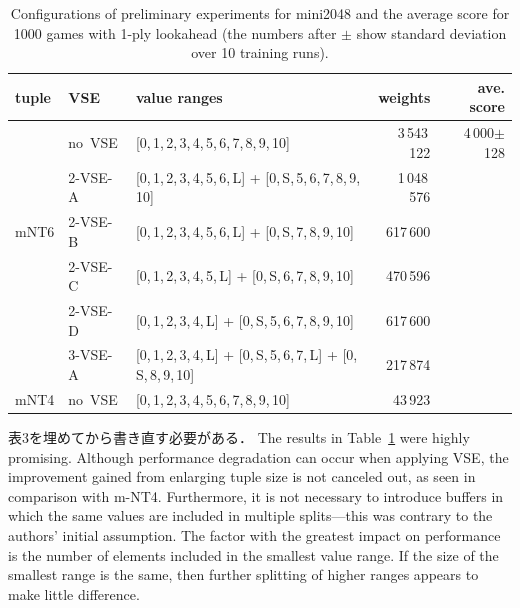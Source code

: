 \begin{table}
\caption{Configurations of preliminary experiments for mini2048 and the average score for 1000 games with 1-ply lookahead (the numbers after $\pm$ show standard deviation over 10 training runs).}
\label{table:pre-results}
 \small\begin{tabular}{l|l|l|r|r}
  \hline\hline
   tuple & VSE & value ranges & weights & ave. score \\
  \hline
   \multirow{5}{*}{mNT6}	& \mbox{no VSE}		& [0,\,1,\,2,\,3,\,4,\,5,\,6,\,7,\,8,\,9,\,10]				& 3\,543\,122	& 4\,000$\pm$128 \\ \cline{2-5}
				& \mbox{2-VSE-A}	& [0,\,1,\,2,\,3,\,4,\,5,\,6,\,L] + [0,\,S,\,5,\,6,\,7,\,8,\,9,\,10]		& 1\,048\,576	& \\ \cline{2-5}
				& \mbox{2-VSE-B}	& [0,\,1,\,2,\,3,\,4,\,5,\,6,\,L] + [0,\,S,\,7,\,8,\,9,\,10]		& 617\,600	& \\ \cline{2-5}
				& \mbox{2-VSE-C}	& [0,\,1,\,2,\,3,\,4,\,5,\,L] + [0,\,S,\,6,\,7,\,8,\,9,\,10]		& 470\,596	& \\ \cline{2-5}
				& \mbox{2-VSE-D}	& [0,\,1,\,2,\,3,\,4,\,L] + [0,\,S,\,5,\,6,\,7,\,8,\,9,\,10]		& 617\,600	& \\ \cline{2-5}
				& \mbox{3-VSE-A}	& [0,\,1,\,2,\,3,\,4,\,L] + [0,\,S,\,5,\,6,\,7,\,L] + [0,\,S,\,8,\,9,\,10]	& 217\,874	& \\ \hline
   mNT4				& \mbox{no VSE}		& [0,\,1,\,2,\,3,\,4,\,5,\,6,\,7,\,8,\,9,\,10]				& 43\,923	& \\\hline
 \end{tabular}
\end{table}


表3を埋めてから書き直す必要がある．
The results in Table~\ref{table:pre-results} were highly promising.
Although performance degradation can occur when applying VSE, the improvement gained from enlarging tuple size is not canceled out, as seen in comparison with m-NT4. Furthermore, it is not necessary to introduce buffers in which the same values are included in multiple splits—this was contrary to the authors' initial assumption. The factor with the greatest impact on performance is the number of elements included in the smallest value range. If the size of the smallest range is the same, then further splitting of higher ranges appears to make little difference.






